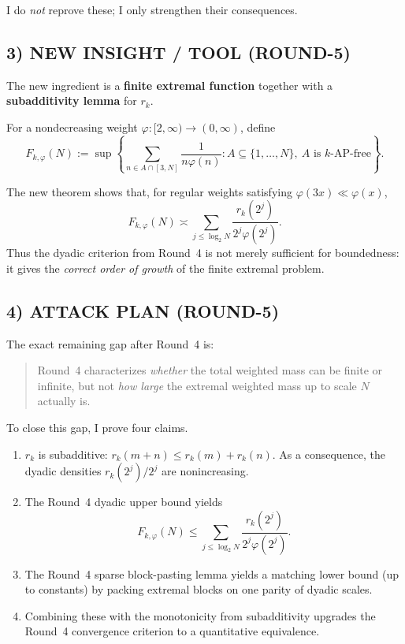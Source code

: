 I do \emph{not} reprove these; I only strengthen their consequences.

\subsection{3) NEW INSIGHT / TOOL (ROUND-5)}

The new ingredient is a \textbf{finite extremal function} together with a \textbf{subadditivity lemma} for $r_k$.

For a nondecreasing weight $\varphi:[2,\infty)\to(0,\infty)$, define
\[
F_{k,\varphi}(N)
:=
\sup\left\{
\sum_{n\in A\cap[3,N]}\frac{1}{n\varphi(n)}:
A\subseteq\{1,\dots,N\},\ A\text{ is }k\text{-AP-free}
\right\}.
\]

The new theorem shows that, for regular weights satisfying $\varphi(3x)\ll \varphi(x)$,
\[
F_{k,\varphi}(N)\asymp \sum_{j\le \log_2 N}\frac{r_k(2^j)}{2^j\varphi(2^j)}.
\]
Thus the dyadic criterion from Round~4 is not merely sufficient for boundedness: it gives the \emph{correct order of growth} of the finite extremal problem.

\subsection{4) ATTACK PLAN (ROUND-5)}

The exact remaining gap after Round~4 is:
\begin{quote}
Round~4 characterizes \emph{whether} the total weighted mass can be finite or infinite, but not \emph{how large} the extremal weighted mass up to scale $N$ actually is.
\end{quote}

To close this gap, I prove four claims.

\begin{enumerate}
\item $r_k$ is subadditive: $r_k(m+n)\le r_k(m)+r_k(n)$. As a consequence, the dyadic densities $r_k(2^j)/2^j$ are nonincreasing.
\item The Round~4 dyadic upper bound yields
\[
F_{k,\varphi}(N)\le \sum_{j\le \log_2 N}\frac{r_k(2^j)}{2^j\varphi(2^j)}.
\]
\item The Round~4 sparse block-pasting lemma yields a matching lower bound (up to constants) by packing extremal blocks on one parity of dyadic scales.
\item Combining these with the monotonicity from subadditivity upgrades the Round~4 convergence criterion to a quantitative equivalence.
\end{enumerate}

